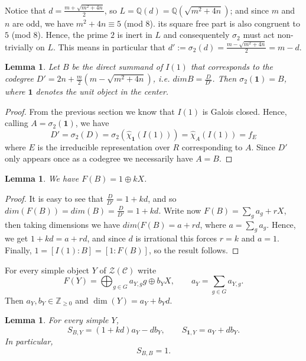 \documentclass[a4paper,twoside,11pt]{amsart}
\newtheorem{lemma}[theorem]{Lemma}
\theoremstyle{plain} %
\theoremstyle{definition}
\begin{document}
 Notice that  $d= \frac{m+\sqrt{m^2+4n}}{2}$, so $L=\mathbb{Q}(d)=\mathbb{Q}(\sqrt{m^2+4n})$; and since $m$ and $n$ are odd, we have $m^2+4n\equiv 5$ (mod $8$). its square free part is also congruent to $5$ (mod $8$). Hence, the prime $2$ is inert in $L$ and consequentely $\sigma_2$ must act non-trivially on $L$. This means in particular that $d':=\sigma_2(d)=\frac{m-\sqrt{m^2+4n}}{2}=m-d$.

\begin{lemma}
    Let $B$ be the direct summand of $I(1)$ that corresponds to the codegree $D'=2n+\frac{m}{2}\left(m-\sqrt{m^2+4n}\right)$, i.e. $dim B=\frac{D}{D'}$. Then $\sigma_2 (\mathbf{1})=B$, where $\mathbf{1}$ denotes the unit object in the center.
\end{lemma}
\begin{proof}
    From the previous section we know that $I(1)$ is Galois closed. Hence, calling $A=\sigma_2 (\mathbf{1})$, we have
\begin{equation}
        D'=\sigma_2(D)=\sigma_2(\widehat{\chi}_{\mathbf{1}} (I(1)))=\widehat{\chi}_{A} (I(1))=f_E
    \end{equation}
    where $E$ is the irreducible representation over $R$ corresponding to $A$. Since $D'$ only appears once as a codegree we necessarily have $A=B$.
\end{proof}

\begin{lemma}
    We have $F(B)=1\oplus kX$.
\end{lemma}
\begin{proof}
   It is easy to see that $\frac{D}{D'}=1+kd$, and so $dim(F(B))=dim(B)=\frac{D}{D'}=1+kd$. Write now $F(B)=\sum_g a_g  +rX$, then taking dimensions we have 
 $dim(F(B)=a+rd$, where $a=\sum_g a_g$. Hence, we get $1+kd=a+rd$, and since $d$ is irrational this forces $r=k$ and $a=1$. Finally, $1=[I(1):B]=[1:F(B)]$, so the result follows. 
\end{proof}
\medskip

For every simple object $Y$ of $\mathcal{Z}(\mathcal{C})$ write
\[
F(Y)=\bigoplus_{g\in G}a_{Y,g}g\oplus b_YX,
\qquad a_Y=\sum_{g\in G}a_{Y,g}.
\]
Then $a_Y,b_Y\in\mathbb Z_{\geq0}$ and
$\dim(Y)=a_Y+b_Yd$.

\begin{lemma}
  For every simple $Y$,
\begin{equation}\label{eq:two-S-rows}
S_{B,Y}=(1+kd)a_Y-db_Y,
\qquad S_{\mathbf 1,Y}=a_Y+db_Y.
\end{equation}
In particular,
\[
S_{B,B}=1.
\]

\end{lemma}
\end{document}
